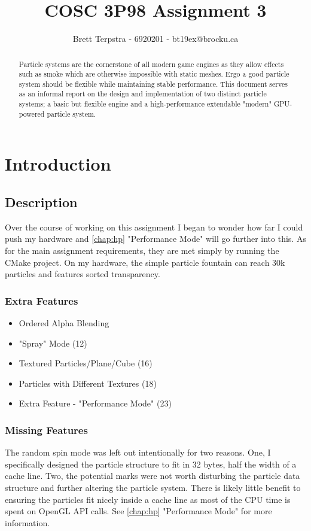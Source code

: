 \documentclass[]{report}
\title{COSC 3P98 Assignment 3}
\author{Brett Terpstra - 6920201 - bt19ex@brocku.ca}
\begin{document}
\maketitle

\begin{abstract}
Particle systems are the cornerstone of all modern game engines as they allow effects such as smoke which are otherwise impossible with static meshes. Ergo a good particle system should be flexible while maintaining stable performance. This document serves as an informal report on the design and implementation of two distinct particle systems; a basic but flexible engine and a high-performance extendable "modern" GPU-powered particle system.
\end{abstract}

\tableofcontents

\chapter{Introduction}
\section{Description}
Over the course of working on this assignment I began to wonder how far I could push my hardware and \autoref{chap:hp} "Performance Mode" will go further into this. As for the main assignment requirements, they are met simply by running the CMake project. On my hardware, the simple particle fountain can reach 30k particles and features sorted transparency.
\subsection{Extra Features}
\begin{itemize}
	\item Ordered Alpha Blending
	\item "Spray" Mode (12)
	\item Textured Particles/Plane/Cube (16)
	\item Particles with Different Textures (18)
	\item Extra Feature - "Performance Mode" (23)
\end{itemize}
\subsection{Missing Features}
The random spin mode was left out intentionally for two reasons. One, I specifically designed the particle structure to fit in 32 bytes, half the width of a cache line. Two, the potential marks were not worth disturbing the particle data structure and further altering the particle system. There is likely little benefit to ensuring the particles fit nicely inside a cache line as most of the CPU time is spent on OpenGL API calls. See \autoref{chap:hp} "Performance Mode" for more information.
\end{document}
